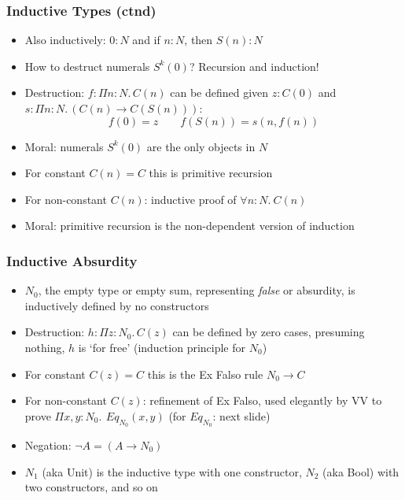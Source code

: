 \documentclass[handout]{beamer}
\newcommand{\depi}[3]{\Pi{#1{:}#2.\,#3}}
\begin{document}
\frame
  {
  
    \frametitle{Inductive Types (ctnd)}

    \begin{itemize}[<+->]
    \item Also inductively: $0:N$ and if $n:N$, then $S(n): N$
    \item How to destruct numerals $S^k (0)$? Recursion and induction!
    \item Destruction: $f: \depi{n}{N}{C(n)}$ can be defined
    given $z: C(0)$ and $s: \depi{n}{N}{(C(n)\to C(S(n)))}$:
     \[f(0)=z \quad\quad  f(S(n)) = s(n,f(n))\]
    \item Moral: numerals $S^k (0)$ are the only objects in $N$
     \item For constant $C(n)=C$ this is primitive recursion
     \item For non-constant $C(n)$: inductive proof of $\forall n{:}N.~C(n)$
     \item Moral: primitive recursion is the non-dependent version of induction
    \end{itemize}
  }
 

\frame
  {
  
    \frametitle{Inductive Absurdity}

    \begin{itemize}[<+->]
    \item $N_0$, the empty type or empty sum, representing \emph{false}
    or absurdity, is inductively defined by {\color{red}no} constructors
    \item Destruction: $h: \depi{z}{N_0}{C(z)}$ can be defined by {\color{red}zero} cases,
    presuming nothing, $h$ is `for free' (induction principle for $N_0$)
    \item For constant $C(z)=C$ this is the Ex Falso rule $N_0\to C$
    \item For non-constant $C(z)$: refinement of Ex Falso, used elegantly by
    VV to prove $\depi{x,y}{N_0}{~Eq_{N_0}(x,y)}$ (for $Eq_{N_0}$: next slide)
    \item Negation: $\neg A = (A\to N_0)$
    \item $N_1$ (aka Unit) is the inductive type with one constructor, 
              $N_2$ (aka Bool) with two constructors, and so on
    \end{itemize}
  }
\end{document}
